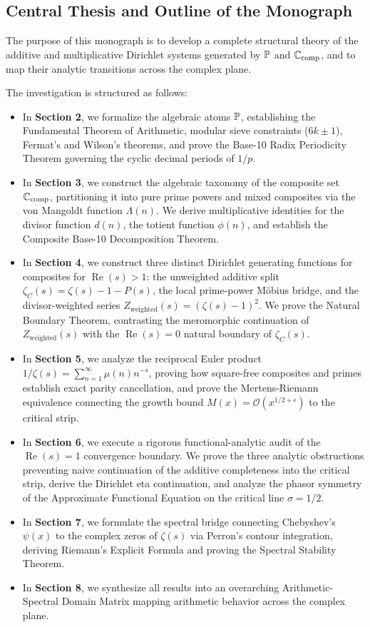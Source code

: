 \subsection{Central Thesis and Outline of the Monograph}

The purpose of this monograph is to develop a complete structural theory of the additive and multiplicative Dirichlet systems generated by $\mathbb{P}$ and $\mathbb{C}_{\mathrm{comp}}$, and to map their analytic transitions across the complex plane. 

The investigation is structured as follows:
\begin{itemize}
  \item In \textbf{Section 2}, we formalize the algebraic atoms $\mathbb{P}$, establishing the Fundamental Theorem of Arithmetic, modular sieve constraints ($6k \pm 1$), Fermat's and Wilson's theorems, and prove the Base-10 Radix Periodicity Theorem governing the cyclic decimal periods of $1/p$.
  \item In \textbf{Section 3}, we construct the algebraic taxonomy of the composite set $\mathbb{C}_{\mathrm{comp}}$, partitioning it into pure prime powers and mixed composites via the von Mangoldt function $\Lambda(n)$. We derive multiplicative identities for the divisor function $d(n)$, the totient function $\phi(n)$, and establish the Composite Base-10 Decomposition Theorem.
  \item In \textbf{Section 4}, we construct three distinct Dirichlet generating functions for composites for $\operatorname{Re}(s) > 1$: the unweighted additive split $\zeta_C(s) = \zeta(s) - 1 - P(s)$, the local prime-power M\"obius bridge, and the divisor-weighted series $Z_{\mathrm{weighted}}(s) = (\zeta(s)-1)^2$. We prove the Natural Boundary Theorem, contrasting the meromorphic continuation of $Z_{\mathrm{weighted}}(s)$ with the $\operatorname{Re}(s) = 0$ natural boundary of $\zeta_C(s)$.
  \item In \textbf{Section 5}, we analyze the reciprocal Euler product $1/\zeta(s) = \sum_{n=1}^\infty \mu(n) n^{-s}$, proving how square-free composites and primes establish exact parity cancellation, and prove the Mertens-Riemann equivalence connecting the growth bound $M(x) = \mathcal{O}(x^{1/2+\epsilon})$ to the critical strip.
  \item In \textbf{Section 6}, we execute a rigorous functional-analytic audit of the $\operatorname{Re}(s) = 1$ convergence boundary. We prove the three analytic obstructions preventing naive continuation of the additive completeness into the critical strip, derive the Dirichlet eta continuation, and analyze the phasor symmetry of the Approximate Functional Equation on the critical line $\sigma = 1/2$.
  \item In \textbf{Section 7}, we formulate the spectral bridge connecting Chebyshev's $\psi(x)$ to the complex zeros of $\zeta(s)$ via Perron's contour integration, deriving Riemann's Explicit Formula and proving the Spectral Stability Theorem.
  \item In \textbf{Section 8}, we synthesize all results into an overarching Arithmetic-Spectral Domain Matrix mapping arithmetic behavior across the complex plane.
\end{itemize}

